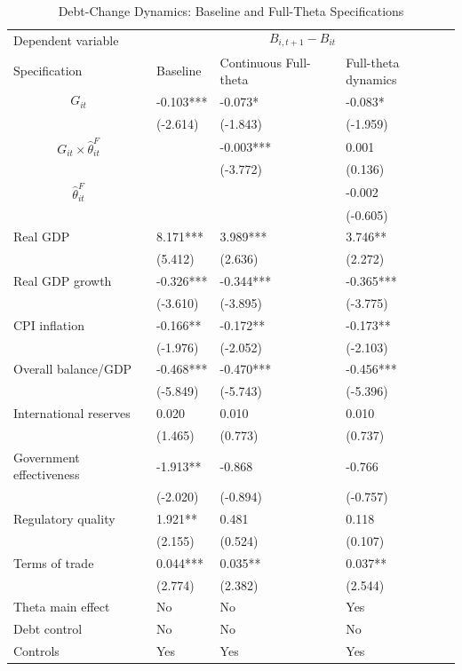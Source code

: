 \begin{table}[H]\centering
\begin{threeparttable}
\caption{Debt-Change Dynamics: Baseline and Full-Theta Specifications}
\label{tab:debt_change_combined_fulltheta}
\scriptsize
\begin{tabularx}{\textwidth}{lYYY}
\toprule
Dependent variable &  \\
\cmidrule(lr){2-4}
Specification & Baseline & Continuous Full-theta & Full-theta dynamics \\
\midrule
$$G_{it}$$ & -0.103*** & -0.073* & -0.083* \\
 & (-2.614) & (-1.843) & (-1.959) \\
$$G_{it}\times\widehat{\theta}^{F}_{it}$$ &  & -0.003*** & 0.001 \\
 &  & (-3.772) & (0.136) \\
$$\widehat{\theta}^{F}_{it}$$ &  &  & -0.002 \\
 &  &  & (-0.605) \\
Real GDP & 8.171*** & 3.989*** & 3.746** \\
 & (5.412) & (2.636) & (2.272) \\
Real GDP growth & -0.326*** & -0.344*** & -0.365*** \\
 & (-3.610) & (-3.895) & (-3.775) \\
CPI inflation & -0.166** & -0.172** & -0.173** \\
 & (-1.976) & (-2.052) & (-2.103) \\
Overall balance/GDP & -0.468*** & -0.470*** & -0.456*** \\
 & (-5.849) & (-5.743) & (-5.396) \\
International reserves & 0.020 & 0.010 & 0.010 \\
 & (1.465) & (0.773) & (0.737) \\
Government effectiveness & -1.913** & -0.868 & -0.766 \\
 & (-2.020) & (-0.894) & (-0.757) \\
Regulatory quality & 1.921** & 0.481 & 0.118 \\
 & (2.155) & (0.524) & (0.107) \\
Terms of trade & 0.044*** & 0.035** & 0.037** \\
 & (2.774) & (2.382) & (2.544) \\
\midrule
Theta main effect & No & No & Yes \\
Debt control & No & No & No \\
Controls & Yes & Yes & Yes \\

\end{tabularx}
\end{threeparttable}
\end{table}
